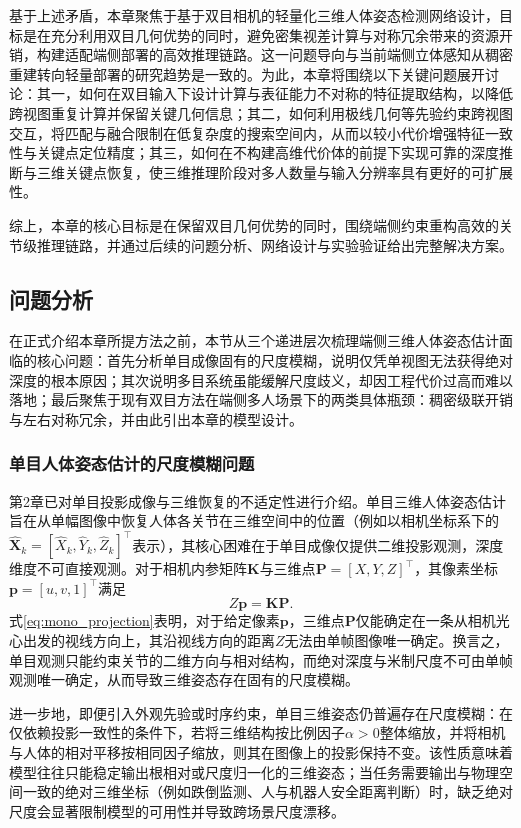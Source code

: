 基于上述矛盾，本章聚焦于基于双目相机的轻量化三维人体姿态检测网络设计，目标是在充分利用双目几何优势的同时，避免密集视差计算与对称冗余带来的资源开销，构建适配端侧部署的高效推理链路。这一问题导向与当前端侧立体感知从稠密重建转向轻量部署的研究趋势是一致的。为此，本章将围绕以下关键问题展开讨论：其一，如何在双目输入下设计计算与表征能力不对称的特征提取结构，以降低跨视图重复计算并保留关键几何信息；其二，如何利用极线几何等先验约束跨视图交互，将匹配与融合限制在低复杂度的搜索空间内，从而以较小代价增强特征一致性与关键点定位精度；其三，如何在不构建高维代价体的前提下实现可靠的深度推断与三维关键点恢复，使三维推理阶段对多人数量与输入分辨率具有更好的可扩展性。

综上，本章的核心目标是在保留双目几何优势的同时，围绕端侧约束重构高效的关节级推理链路，并通过后续的问题分析、网络设计与实验验证给出完整解决方案。
\subsection{问题分析}

在正式介绍本章所提方法之前，本节从三个递进层次梳理端侧三维人体姿态估计面临的核心问题：首先分析单目成像固有的尺度模糊，说明仅凭单视图无法获得绝对深度的根本原因；其次说明多目系统虽能缓解尺度歧义，却因工程代价过高而难以落地；最后聚焦于现有双目方法在端侧多人场景下的两类具体瓶颈：稠密级联开销与左右对称冗余，并由此引出本章的模型设计。

\subsubsection{单目人体姿态估计的尺度模糊问题}
第2章已对单目投影成像与三维恢复的不适定性进行介绍。单目三维人体姿态估计旨在从单幅图像中恢复人体各关节在三维空间中的位置（例如以相机坐标系下的$\hat{\mathbf{X}}_k=[\hat{X}_k,\hat{Y}_k,\hat{Z}_k]^\top$表示），其核心困难在于单目成像仅提供二维投影观测，深度维度不可直接观测。对于相机内参矩阵$\mathbf{K}$与三维点$\mathbf{P}=[X,Y,Z]^\top$，其像素坐标$\mathbf{p}=[u,v,1]^\top$满足
\begin{equation}
Z\mathbf{p}=\mathbf{K}\mathbf{P}.
\label{eq:mono_projection}
\end{equation}
式\eqref{eq:mono_projection}表明，对于给定像素$\mathbf{p}$，三维点$\mathbf{P}$仅能确定在一条从相机光心出发的视线方向上，其沿视线方向的距离$Z$无法由单帧图像唯一确定。换言之，单目观测只能约束关节的二维方向与相对结构，而绝对深度与米制尺度不可由单帧观测唯一确定，从而导致三维姿态存在固有的尺度模糊。

进一步地，即便引入外观先验或时序约束，单目三维姿态仍普遍存在尺度模糊：在仅依赖投影一致性的条件下，若将三维结构按比例因子$\alpha>0$整体缩放，并将相机与人体的相对平移按相同因子缩放，则其在图像上的投影保持不变。该性质意味着模型往往只能稳定输出根相对或尺度归一化的三维姿态；当任务需要输出与物理空间一致的绝对三维坐标（例如跌倒监测、人与机器人安全距离判断）时，缺乏绝对尺度会显著限制模型的可用性并导致跨场景尺度漂移。

